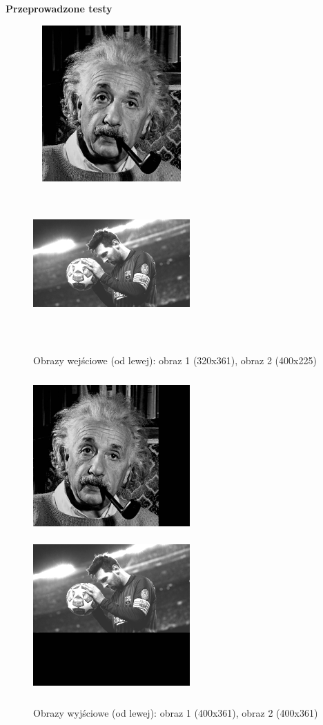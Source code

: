 \documentclass[magisterska,openany]{pracadypl}
\begin{document}
\vspace{0.25cm}\textbf{\Large Przeprowadzone testy}
\vspace{0.5cm}
\begin{figure}[h]
\centering
\includegraphics[width=6cm, height=6cm]{orgi/gae.jpg}
\includegraphics[width=6cm, height=6cm]{orgi/gMessi.jpg}
\caption{Obrazy wejściowe (od lewej): obraz 1 (320x361), obraz 2 (400x225) }
\end{figure}
\begin{figure}[h]
\centering
\includegraphics[width=6cm, height=6cm]{2_1/GeoG1.jpg}
\includegraphics[width=6cm, height=6cm]{2_1/GeoG2.jpg}
\caption{Obrazy wyjściowe (od lewej): obraz 1 (400x361), obraz 2 (400x361) }
\end{figure}
\end{document}
